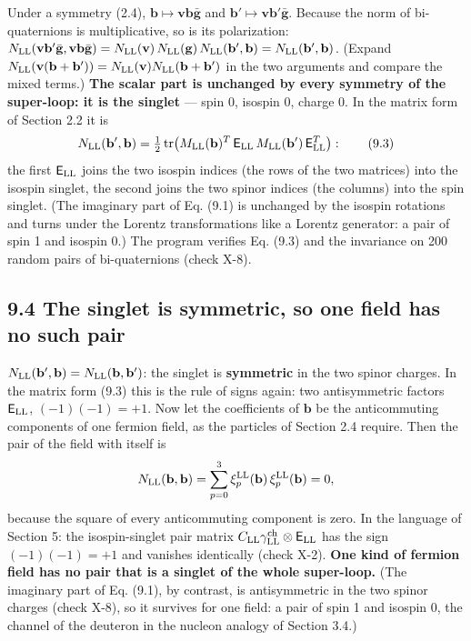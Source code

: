 \documentclass[
  10pt,
]{article}
\begin{document}
Under a symmetry (2.4),
\(\mathbf b\mapsto\mathbf v\mathbf b\bar{\mathbf g}\) and
\(\mathbf b'\mapsto\mathbf v\mathbf b'\bar{\mathbf g}\). Because the
norm of bi-quaternions is multiplicative, so is its polarization:
\(N_{\rm LL}(\mathbf v\mathbf b'\bar{\mathbf g},\mathbf v\mathbf b\bar{\mathbf g})=N_{\rm LL}(\mathbf v)\,N_{\rm LL}(\mathbf g)\,N_{\rm LL}(\mathbf b',\mathbf b)=N_{\rm LL}(\mathbf b',\mathbf b)\).
(Expand
\(N_{\rm LL}(\mathbf v(\mathbf b+\mathbf b'))=N_{\rm LL}(\mathbf v)N_{\rm LL}(\mathbf b+\mathbf b')\)
in the two arguments and compare the mixed terms.) \textbf{The scalar
part is unchanged by every symmetry of the super-loop: it is the
singlet} --- spin 0, isospin 0, charge 0. In the matrix form of Section
2.2 it is
\[N_{\rm LL}(\mathbf b',\mathbf b)=\tfrac12\,\mathrm{tr}\big(M_{\rm LL}(\mathbf b)^T\,\mathsf E_{\rm LL}\,M_{\rm LL}(\mathbf b')\,\mathsf E_{\rm LL}^T\big): \tag{9.3}\]
the first \(\mathsf E_{\rm LL}\) joins the two isospin indices (the rows
of the two matrices) into the isospin singlet, the second joins the two
spinor indices (the columns) into the spin singlet. (The imaginary part
of Eq. (9.1) is unchanged by the isospin rotations and turns under the
Lorentz transformations like a Lorentz generator: a pair of spin 1 and
isospin 0.) The program verifies Eq. (9.3) and the invariance on 200
random pairs of bi-quaternions (check X-8).

\hypertarget{the-singlet-is-symmetric-so-one-field-has-no-such-pair}{%
\subsection{9.4 The singlet is symmetric, so one field has no such
pair}\label{the-singlet-is-symmetric-so-one-field-has-no-such-pair}}

\(N_{\rm LL}(\mathbf b',\mathbf b)=N_{\rm LL}(\mathbf b,\mathbf b')\):
the singlet is \textbf{symmetric} in the two spinor charges. In the
matrix form (9.3) this is the rule of signs again: two antisymmetric
factors \(\mathsf E_{\rm LL}\), \((-1)(-1)=+1\). Now let the
coefficients of \(\mathbf b\) be the anticommuting components of one
fermion field, as the particles of Section 2.4 require. Then the pair of
the field with itself is
\[N_{\rm LL}(\mathbf b,\mathbf b)=\sum_{p=0}^3\xi^{\rm LL}_p(\mathbf b)\,\xi^{\rm LL}_p(\mathbf b)=0 ,\]
because the square of every anticommuting component is zero. In the
language of Section 5: the isospin-singlet pair matrix
\(C_{\rm LL}\gamma^{\rm ch}_{\rm LL}\otimes\mathsf E_{\rm LL}\) has the
sign \((-1)(-1)=+1\) and vanishes identically (check X-2). \textbf{One
kind of fermion field has no pair that is a singlet of the whole
super-loop.} (The imaginary part of Eq. (9.1), by contrast, is
antisymmetric in the two spinor charges (check X-8), so it survives for
one field: a pair of spin 1 and isospin 0, the channel of the deuteron
in the nucleon analogy of Section 3.4.)
\end{document}

